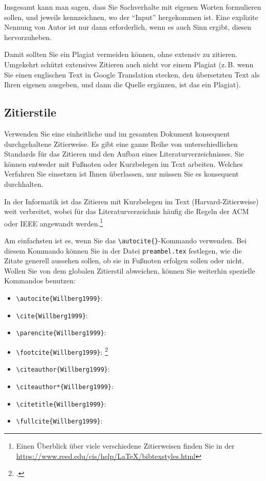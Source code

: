 \documentclass[conference,compsoc,final,a4paper]{IEEEtran}
\begin{document}
    Insgesamt kann man sagen, dass Sie Sachverhalte mit eigenen Worten formulieren sollen, und jeweils kennzeichnen, wo der \enquote{Input} hergekommen ist. Eine explizite Nennung von Autor ist nur dann erforderlich, wenn es auch Sinn ergibt, diesen hervorzuheben.

    Damit sollten Sie ein Plagiat vermeiden können, ohne extensiv zu zitieren. Umgekehrt schützt extensives Zitieren auch nicht vor einem Plagiat (z.\,B. wenn Sie einen englischen Text in Google Translation stecken, den übersetzten Text als Ihren eigenen ausgeben, und dann die Quelle ergänzen, ist das ein Plagiat).

    \subsection{Zitierstile}
    Verwenden Sie eine einheitliche und im gesamten Dokument konsequent durchgehaltene Zitierweise. Es gibt eine ganze Reihe von unterschiedlichen Standards für das Zitieren und den Aufbau eines Literaturverzeichnisses. Sie können entweder mit Fußnoten oder Kurzbelegen im Text arbeiten. Welches Verfahren Sie einsetzen ist Ihnen überlassen, nur müssen Sie es konsequent durchhalten.

    In der Informatik ist das Zitieren mit Kurzbelegen im Text (Harvard-Zitierweise) weit verbreitet, wobei für das Literaturverzeichnis häufig die Regeln der \ac{ACM} oder \ac{IEEE} angewandt werden.\footnote{Einen Überblick über viele verschiedene Zitierweisen finden Sie in der \url{https://www.reed.edu/cis/help/LaTeX/bibtexstyles.html}}

    Am einfachsten ist es, wenn Sie das \verb+\autocite{}+-Kommando verwenden. Bei diesem Kommando können Sie in der Datei \texttt{preambel.tex} festlegen, wie die Zitate generell aussehen sollen, \zb{} ob sie in Fußnoten erfolgen sollen oder nicht. Wollen Sie von dem globalen Zitierstil abweichen, können Sie weiterhin spezielle Kommandos benutzen:

    \begin{itemize}
        \item \verb+\autocite{Willberg1999}+: \autocite{Willberg1999}
        \item \verb+\cite{Willberg1999}+: \cite{Willberg1999}
        \item \verb+\parencite{Willberg1999}+: \parencite{Willberg1999}
        \item \verb+\footcite{Willberg1999}+: \footcite{Willberg1999}
        \item \verb+\citeauthor{Willberg1999}+: \citeauthor{Willberg1999}
        \item \verb+\citeauthor*{Willberg1999}+: \citeauthor*{Willberg1999}
        \item \verb+\citetitle{Willberg1999}+: 
        \item \verb+\fullcite{Willberg1999}+: 
    \end{itemize}
\end{document}
